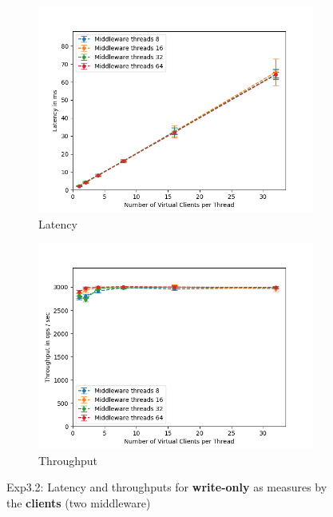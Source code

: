 \documentclass[11pt,a4paper]{article}
\begin{document}
\begin{figure}[H]
\centering
\begin{subfigure}{.5\textwidth}
    \centering
    \includegraphics[width=\textwidth]{img/exp3_2/exp3_2__latency_client_write_0.png}
    \caption{Latency}
    \label{fig:mesh1}
\end{subfigure}%
\begin{subfigure}{.5\textwidth}
      \centering
    \includegraphics[width=\textwidth]{img/exp3_2/exp3_2__throughput_client_write_0.png}
    \caption{Throughput}
    \label{fig:mesh1}
\end{subfigure}
\caption{Exp3.2: Latency and throughputs for \textbf{write-only} as measures by the \textbf{clients} (two middleware)}
\label{fig:test}
\end{figure}
\end{document}
